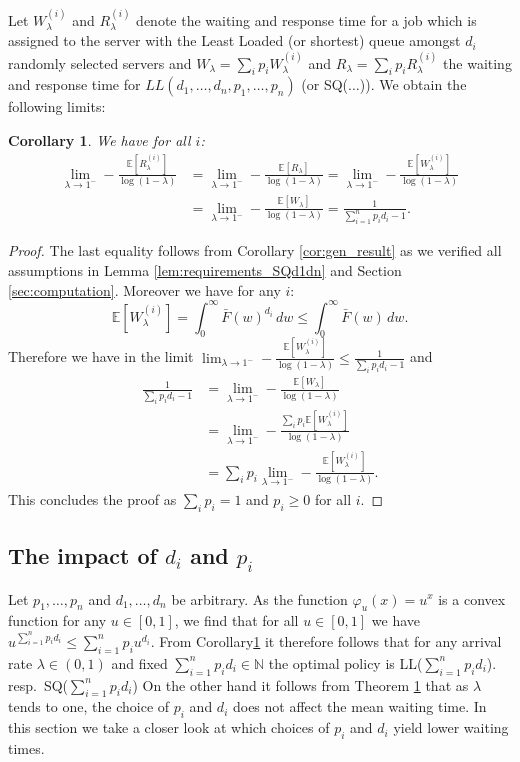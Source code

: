 \documentclass[12pt]{report}
\newcommand{\E}{\mathbb{E}}
\newtheorem{corollary}[theorem]{Corollary}
\begin{document}
Let $W_\lambda^{(i)}$ and $R_\lambda^{(i)}$ denote the waiting and response time for a job which is assigned to the server with the Least Loaded (or shortest) queue amongst $d_i$ randomly selected servers and $W_\lambda=\sum_i p_i W_\lambda^{(i)}$ and $R_\lambda=\sum_i p_i R_\lambda^{(i)}$ the waiting and response time for $LL(d_1,\dots,d_n,p_1,\dots,p_n)$ (or SQ($\dots$)). We obtain the following limits:
\begin{corollary} \label{thm:LLd1dn}
We have for all $i$:
\begin{align*}
\lim_{\lambda\rightarrow 1^-} - \frac{\E[R_\lambda^{(i)}]}{\log(1-\lambda)}
&= \lim_{\lambda\rightarrow 1^-} - \frac{\E[R_\lambda]}{\log(1-\lambda)}
= \lim_{\lambda\rightarrow 1^-} - \frac{\E[W_\lambda^{(i)}]}{\log(1-\lambda)}\\
&= \lim_{\lambda\rightarrow 1^-} - \frac{\E[W_\lambda]}{\log(1-\lambda)}
= \frac{1}{\sum_{i=1}^n p_i d_i - 1}.
\end{align*}
\end{corollary}
\begin{proof}
The last equality follows from Corollary \ref{cor:gen_result} as we verified all assumptions in Lemma \ref{lem:requirements_SQd1dn} and Section \ref{sec:computation}.
Moreover we have for any $i$:
$$
\E[W_\lambda^{(i)}]
=
\int_0^\infty \bar F(w)^{d_i} \, dw
\leq \int_0^\infty \bar F(w) \, dw.
$$
Therefore we have in the limit $\lim_{\lambda\rightarrow 1^-} - \frac{\E[W_\lambda^{(i)}]}{\log(1-\lambda)} \leq \frac{1}{\sum_i p_i d_i - 1}$ and
\begin{align*}
\frac{1}{\sum_i p_i d_i - 1}
&=\lim_{\lambda\rightarrow 1^-} -\frac{\E[W_\lambda]}{\log(1-\lambda)}\\
&=
\lim_{\lambda\rightarrow 1^-} -\frac{\sum_i p_i \E[W_\lambda^{(i)}]}{\log(1-\lambda)}\\
&=
\sum_i p_i \lim_{\lambda\rightarrow 1^-} -\frac{\E[W_\lambda^{(i)}]}{\log(1-\lambda)}.
\end{align*}
This concludes the proof as $\sum_i p_i = 1$ and $p_i \geq 0$ for all $i$.
\end{proof}

\subsection{The impact of $d_i$ and $p_i$} \label{sec:impact_di_pi}
Let $p_1,\dots,p_n$ and $d_1,\dots,d_n$ be arbitrary. As the function $\varphi_u(x)=u^x$ is a convex function for any $u\in [0,1]$, we find that for all $u \in [0,1]$ we have $u^{\sum_{i=1}^n p_i d_i} \leq \sum_{i=1}^n p_i u^{d_i}$. From Corollary\ref{thm:LLd1dn} it therefore follows that for any arrival rate $\lambda \in (0,1)$ and fixed $\sum_{i=1}^n p_i d_i \in \mathbb{N}$ the optimal policy is LL($\sum_{i=1}^n p_i d_i$). resp.~SQ($\sum_{i=1}^n p_i d_i$) On the other hand it follows from Theorem \ref{thm:LLd1dn} that as $\lambda$ tends to one, the choice of $p_i$ and $d_i$ does not affect the mean waiting time. In this section we take a closer look at which choices of $p_i$ and $d_i$ yield lower waiting times.
\end{document}

